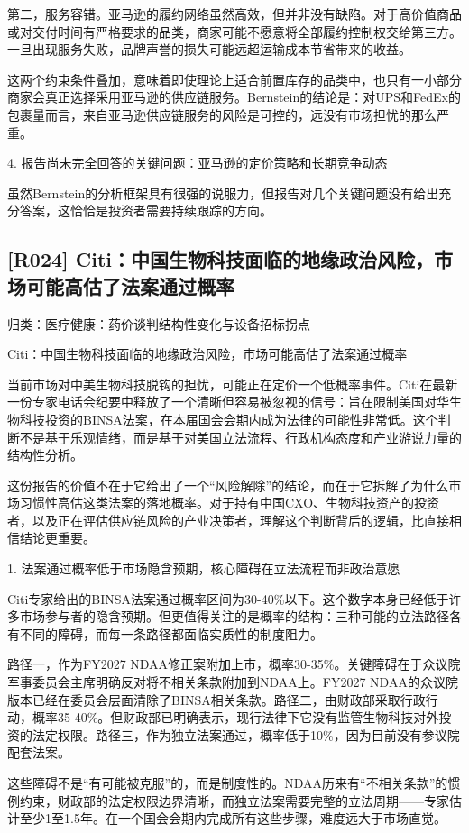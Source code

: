 \documentclass[11pt]{ctexart}
\begin{document}
第二，服务容错。亚马逊的履约网络虽然高效，但并非没有缺陷。对于高价值商品或对交付时间有严格要求的品类，商家可能不愿意将全部履约控制权交给第三方。一旦出现服务失败，品牌声誉的损失可能远超运输成本节省带来的收益。

这两个约束条件叠加，意味着即使理论上适合前置库存的品类中，也只有一小部分商家会真正选择采用亚马逊的供应链服务。Bernstein的结论是：对UPS和FedEx的包裹量而言，来自亚马逊供应链服务的风险是可控的，远没有市场担忧的那么严重。

4. 报告尚未完全回答的关键问题：亚马逊的定价策略和长期竞争动态

虽然Bernstein的分析框架具有很强的说服力，但报告对几个关键问题没有给出充分答案，这恰恰是投资者需要持续跟踪的方向。

\subsection{[R024] Citi：中国生物科技面临的地缘政治风险，市场可能高估了法案通过概率}
{\small\color{refgray}归类：医疗健康：药价谈判结构性变化与设备招标拐点}

Citi：中国生物科技面临的地缘政治风险，市场可能高估了法案通过概率

当前市场对中美生物科技脱钩的担忧，可能正在定价一个低概率事件。Citi在最新一份专家电话会纪要中释放了一个清晰但容易被忽视的信号：旨在限制美国对华生物科技投资的BINSA法案，在本届国会会期内成为法律的可能性非常低。这个判断不是基于乐观情绪，而是基于对美国立法流程、行政机构态度和产业游说力量的结构性分析。

这份报告的价值不在于它给出了一个“风险解除”的结论，而在于它拆解了为什么市场习惯性高估这类法案的落地概率。对于持有中国CXO、生物科技资产的投资者，以及正在评估供应链风险的产业决策者，理解这个判断背后的逻辑，比直接相信结论更重要。

1. 法案通过概率低于市场隐含预期，核心障碍在立法流程而非政治意愿

Citi专家给出的BINSA法案通过概率区间为30-40\%以下。这个数字本身已经低于许多市场参与者的隐含预期。但更值得关注的是概率的结构：三种可能的立法路径各有不同的障碍，而每一条路径都面临实质性的制度阻力。

路径一，作为FY2027 NDAA修正案附加上市，概率30-35\%。关键障碍在于众议院军事委员会主席明确反对将不相关条款附加到NDAA上。FY2027 NDAA的众议院版本已经在委员会层面清除了BINSA相关条款。路径二，由财政部采取行政行动，概率35-40\%。但财政部已明确表示，现行法律下它没有监管生物科技对外投资的法定权限。路径三，作为独立法案通过，概率低于10\%，因为目前没有参议院配套法案。

这些障碍不是“有可能被克服”的，而是制度性的。NDAA历来有“不相关条款”的惯例约束，财政部的法定权限边界清晰，而独立法案需要完整的立法周期——专家估计至少1至1.5年。在一个国会会期内完成所有这些步骤，难度远大于市场直觉。
\end{document}
